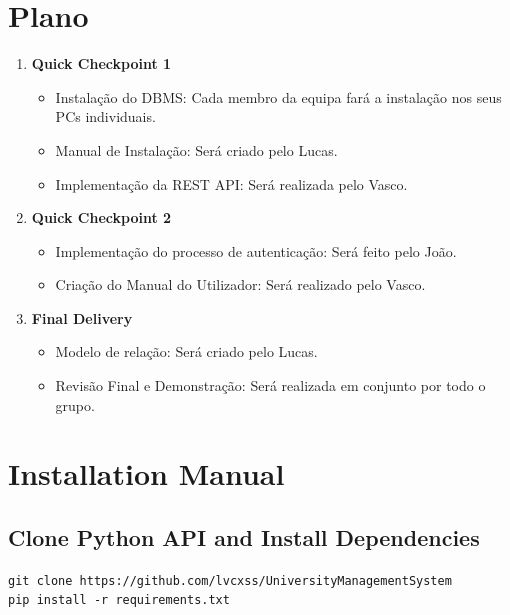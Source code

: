 \documentclass[a4paper, 11pt]{article}
\begin{document}
\section{Plano}

\begin{enumerate}
  \item \textbf{Quick Checkpoint 1}
    \begin{itemize}
      \item Instalação do DBMS: Cada membro da equipa fará a instalação nos seus PCs individuais.
      \item Manual de Instalação: Será criado pelo Lucas.
      \item Implementação da REST API: Será realizada pelo Vasco.
    \end{itemize}

  \item\textbf{Quick Checkpoint 2}
    \begin{itemize}
      \item Implementação do processo de autenticação: Será feito pelo João.
      \item Criação do Manual do Utilizador: Será realizado pelo Vasco.
    \end{itemize}

  \item \textbf{Final Delivery}
    \begin{itemize}
      \item Modelo de relação: Será criado pelo Lucas. 
      \item Revisão Final e Demonstração: Será realizada em conjunto por todo o grupo.
    \end{itemize}
\end{enumerate}


\section{Installation Manual}

\subsection{Clone Python API and Install Dependencies}
\texttt{git clone https://github.com/lvcxss/UniversityManagementSystem\\pip install -r requirements.txt}
\end{document}
